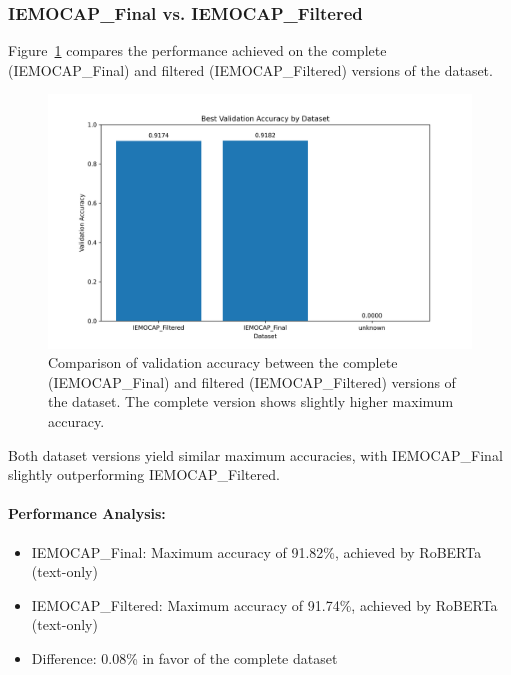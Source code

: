 \documentclass[12pt]{article}
\begin{document}
\subsubsection{IEMOCAP\_Final vs. IEMOCAP\_Filtered}
Figure~\ref{fig:dataset_comparison} compares the performance achieved on the complete (IEMOCAP\_Final) and filtered (IEMOCAP\_Filtered) versions of the dataset.

\begin{figure}[h]
    \centering
    \includegraphics[width=0.9\linewidth]{Figures/dataset_comparison.png}
    \caption{Comparison of validation accuracy between the complete (IEMOCAP\_Final) and filtered (IEMOCAP\_Filtered) versions of the dataset. The complete version shows slightly higher maximum accuracy.}
    \label{fig:dataset_comparison}
\end{figure}

Both dataset versions yield similar maximum accuracies, with IEMOCAP\_Final slightly outperforming IEMOCAP\_Filtered.

\paragraph{Performance Analysis:}
\begin{itemize}
    \item IEMOCAP\_Final: Maximum accuracy of 91.82\%, achieved by RoBERTa (text-only)
    \item IEMOCAP\_Filtered: Maximum accuracy of 91.74\%, achieved by RoBERTa (text-only)
    \item Difference: 0.08\% in favor of the complete dataset
\end{itemize}
\end{document}

